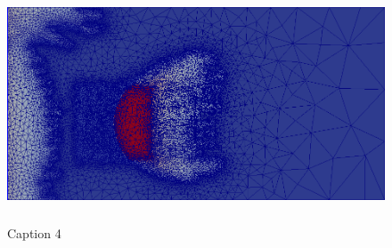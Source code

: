 \documentclass[preprint,authoryear,12pt]{elsarticle}
\begin{document}
\begin{figure}[h]
\begin{center}
\centering
\includegraphics[width=0.8\linewidth, height=7cm]{./Pics/4r_po_adapt_fine_100_mesh}
\caption{Caption 4}
\label{fig:4}
\end{center}
 
\label{fig:image2}
\end{figure}
\pagebreak
\clearpage
\end{document}
